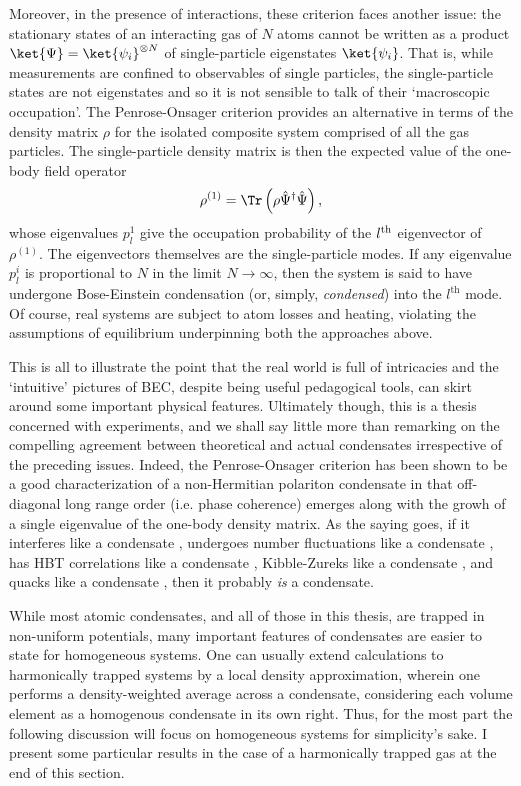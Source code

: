 	Moreover, in the presence of interactions, these criterion faces another issue: the stationary states of an interacting gas of $N$ atoms cannot be written as a product $\ket{\Psi} = \ket{\psi_i}^{\otimes N}$ of single-particle eigenstates $\ket{\psi_i}$.
	That is, while measurements are confined to observables of single particles, the single-particle states are not eigenstates and so it is not sensible to talk of their `macroscopic occupation'.
	The Penrose-Onsager criterion \cite{Penrose56} provides an alternative in terms of the density matrix $\rho$ for the isolated composite system comprised of all the gas particles.
	The single-particle density matrix is then the expected value of the one-body field operator
	\begin{equation}
		\rho^{(1)} = \Tr\left(\rho\hat{\Psi}^\dagger\hat{\Psi}\right),
	\end{equation}
	whose eigenvalues $p_{l}^{1}$ give the occupation probability of the $l^{\rm th}$ eigenvector of $\rho^{(1)}$.
	The eigenvectors themselves are the single-particle modes.
	If any eigenvalue $p_{l}^{i}$ is proportional to $N$ in the limit $N\rightarrow\infty$, then the system is said to have undergone Bose-Einstein condensation (or, simply, \emph{condensed}) into the $l^\textrm{th}$ mode.
	Of course, real systems are subject to atom losses and heating, violating the assumptions of equilibrium underpinning both the approaches above.
	
	This is all to illustrate the point that the real world is full of intricacies and the `intuitive' pictures of BEC, despite being useful pedagogical tools, can skirt around some important physical features.
	Ultimately though, this is a thesis concerned with experiments, and we shall say little more than remarking on the compelling agreement between theoretical and actual condensates irrespective of the preceding issues.
	Indeed, the Penrose-Onsager criterion has been shown to be a good characterization of a non-Hermitian polariton condensate \cite{Manni12} in that off-diagonal long range order (i.e. phase coherence) emerges along with the growh of a single eigenvalue of the one-body density matrix.
	As the saying goes, if it interferes like a condensate \cite{Andrews97} , undergoes number fluctuations like a condensate \cite{Kristensen19},  has HBT correlations like a condensate \cite{Schellekens05,Jeltes07}, Kibble-Zureks like a condensate \cite{Anquez16}, and quacks like a condensate \cite{Duck01}, then it probably \emph{is} a condensate.

	While most atomic condensates, and all of those in this thesis, are trapped in non-uniform potentials, many important features of condensates are easier to state for homogeneous systems.
	One can usually extend calculations to harmonically trapped systems by a local density approximation, wherein one performs a density-weighted average across a condensate, considering each volume element as a homogenous condensate in its own right.
	Thus, for the most part the following discussion will focus on homogeneous systems for simplicity's sake.
	I present some particular results in the case of a harmonically trapped gas at the end of this section.

